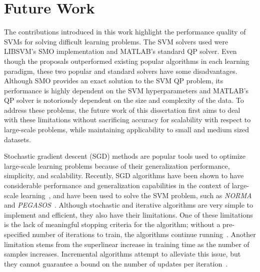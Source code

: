 \documentclass[reqno]{vcuthesis}
\numberwithin{equation}{chapter}
\begin{document}
\chapter{Future Work}
The contributions introduced in this work highlight the performance quality of SVMs for solving difficult learning problems. The SVM solvers used were LIBSVM's SMO implementation and MATLAB's standard QP solver. Even though the proposals outperformed existing popular algorithms in each learning paradigm, these two popular and standard solvers have some disadvantages. Although SMO provides an exact solution to the SVM QP problem, its performance is highly dependent on the SVM hyperparameters and MATLAB's QP solver is notoriously dependent on the size and complexity of the data. To address these problems, the future work of this dissertation first aims to deal with these limitations without sacrificing accuracy for scalability with respect to large-scale problems, while maintaining applicability to small and medium sized datasets. 

Stochastic gradient descent (SGD) methods are popular tools used to optimize large-scale learning problems because of their generalization performance, simplicity, and scalability. Recently, SGD algorithms have been shown to have considerable performance and generalization capabilities in the context of large-scale learning~\cite{bottou2010large}, and have been used to solve the SVM problem, such as \textit{NORMA}~\cite{kivinen2004online} and \textit{PEGASOS}~\cite{shalev2011pegasos,zhang2004solving}. Although stochastic and iterative algorithms are very simple to implement and efficient, they also have their limitations. One of these limitations is the lack of meaningful stopping criteria for the algorithm; without a pre-specified number of iterations to train, the algorithms continue running~\cite{panagiotakopoulos2013stochastic}. Another limitation stems from the superlinear increase in training time as the number of samples increases. Incremental algorithms attempt to alleviate this issue, but they cannot guarantee a bound on the number of updates per iteration~\cite{cauwenberghs2001incremental}. 
\end{document}
